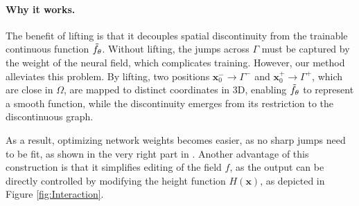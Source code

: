 



\paragraph{Why it works.} 
The benefit of lifting is that it decouples spatial discontinuity from the trainable continuous function $\Tilde{f}_{\theta}$. Without lifting, the jumps across $\Gamma$ must be captured by the weight of the neural field, which complicates training. However, our method alleviates this problem. By lifting, two positions $ \bm{x}_0^- \to \Gamma^- $ and $ \bm{x}_0^+ \to \Gamma^+ $, which are close in $\Omega $, are mapped to distinct coordinates in 3D, enabling $\Tilde{f}_{\theta}$ to represent a smooth function, while the discontinuity emerges from its restriction to the discontinuous graph.

As a result, optimizing network weights becomes easier, as no sharp jumps need to be fit, as shown in the very right part in . Another advantage of this construction is that it simplifies editing of the field $f$, as the output can be directly controlled by modifying the height function $H(\mathbf{x})$, as depicted in Figure \ref{fig:Interaction}.




